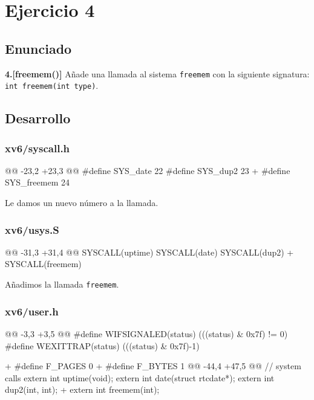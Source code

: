 \section{Ejercicio 4}

\subsection{Enunciado}
\begin{ejer}
    \textbf{4.[freemem()]} Añade una llamada al sistema \texttt{freemem} con la siguiente 
    signatura: \texttt{int freemem(int type)}.
\end{ejer}

\subsection{Desarrollo}

\subsubsection{xv6/syscall.h}
\begin{listing}
@@ -23,2 +23,3 @@
    #define SYS_date   22
    #define SYS_dup2   23
+   #define SYS_freemem 24
\end{listing}
\par Le damos un nuevo número a la llamada.

\subsubsection{xv6/usys.S}
\begin{listing}
@@ -31,3 +31,4 @@
    SYSCALL(uptime)
    SYSCALL(date)
    SYSCALL(dup2)
+   SYSCALL(freemem)
\end{listing}
\par Añadimos la llamada \texttt{freemem}.

\subsubsection{xv6/user.h}
\begin{listing}
@@ -3,3 +3,5 @@
    #define WIFSIGNALED(status) (((status) & 0x7f) != 0)
    #define WEXITTRAP(status)   (((status) & 0x7f)-1)

+   #define F_PAGES 0
+   #define F_BYTES 1
@@ -44,4 +47,5 @@ 
// system calls
    extern int uptime(void);
    extern int date(struct rtcdate*);
    extern int dup2(int, int);
+   extern int freemem(int);
\end{listing}


